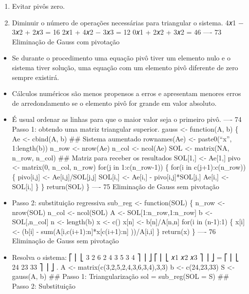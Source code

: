 \documentclass[
]{article}
\providecommand{\tightlist}{%
  \setlength{\itemsep}{0pt}\setlength{\parskip}{0pt}}
\begin{document}
\begin{enumerate}
\def\labelenumi{\arabic{enumi}.}
\tightlist
\item
  Evitar pivôs zero.
\item
  Diminuir o número de operações necessárias para triangular o sistema.
  4𝑥1 − 3𝑥2 + 2𝑥3 = 16 2𝑥1 + 4𝑥2 − 3𝑥3 = 12 0𝑥1 + 2𝑥2 + 3𝑥2 = 46 ---- 73
  Eliminação de Gauss com pivotação
\end{enumerate}

\begin{itemize}
\tightlist
\item
  Se durante o procedimento uma equação pivô tiver um elemento nulo e o
  sistema tiver solução, uma equação com um elemento pivô diferente de
  zero sempre existirá.
\item
  Cálculos numéricos são menos propensos a erros e apresentam menores
  erros de arredondamento se o elemento pivô for grande em valor
  absoluto.
\item
  É usual ordenar as linhas para que o maior valor seja o primeiro pivô.
  ---- 74 Passo 1: obtendo uma matriz triangular superior. gauss
  \textless- function(A, b) \{ Ae \textless- cbind(A, b) \#\# Sistema
  aumentado rownames(Ae) \textless- paste0(``x'', 1:length(b)) n\_row
  \textless- nrow(Ae) n\_col \textless- ncol(Ae) SOL \textless-
  matrix(NA, n\_row, n\_col) \#\# Matriz para receber os resultados
  SOL{[}1,{]} \textless- Ae{[}1,{]} pivo \textless- matrix(0, n\_col,
  n\_row) for(j in 1:c(n\_row-1)) \{ for(i in c(j+1):c(n\_row)) \{
  pivo{[}i,j{]} \textless- Ae{[}i,j{]}/SOL{[}j,j{]} SOL{[}i,{]}
  \textless- Ae{[}i,{]} - pivo{[}i,j{]}*SOL{[}j,{]} Ae{[}i,{]}
  \textless- SOL{[}i,{]} \} \} return(SOL) \} ---- 75 Eliminação de
  Gauss sem pivotação
\item
  Passo 2: substituição regressiva sub\_reg \textless- function(SOL) \{
  n\_row \textless- nrow(SOL) n\_col \textless- ncol(SOL) A \textless-
  SOL{[}1:n\_row,1:n\_row{]} b \textless- SOL{[},n\_col{]} n \textless-
  length(b) x \textless- c() x{[}n{]} \textless- b{[}n{]}/A{[}n,n{]}
  for(i in (n-1):1) \{ x{[}i{]} \textless- (b{[}i{]} -
  sum(A{[}i,c(i+1):n{]}*x{[}c(i+1):n{]} ))/A{[}i,i{]} \} return(x) \}
  ---- 76 Eliminação de Gauss sem pivotação
\item
  Resolva o sistema: ⎡ ⎢ ⎣ 3 2 6 2 4 3 5 3 4 ⎤ ⎥ ⎦ ⎡ ⎢ ⎣ 𝑥1 𝑥2 𝑥3 ⎤ ⎥ ⎦
  = ⎡ ⎢ ⎣ 24 23 33 ⎤ ⎥ ⎦ . A \textless- matrix(c(3,2,5,2,4,3,6,3,4),3,3)
  b \textless- c(24,23,33) S \textless- gauss(A, b) \#\# Passo 1:
  Triangularização sol = sub\_reg(SOL = S) \#\# Passo 2: Substituição

\end{itemize}
\end{document}
